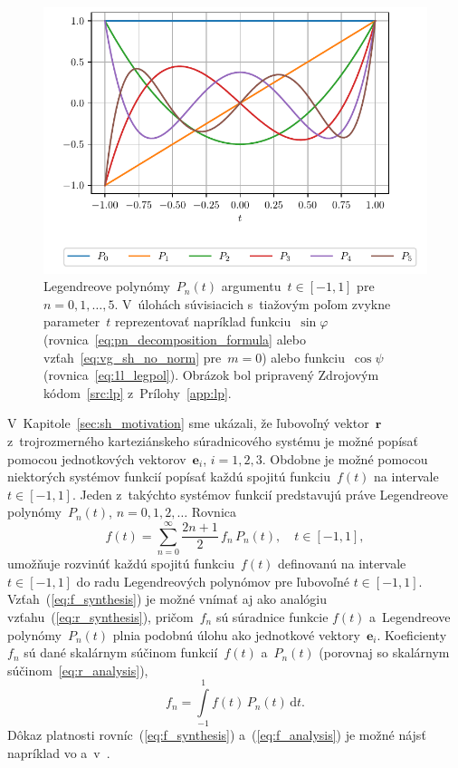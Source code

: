 \documentclass[a4paper, 12pt]{book}
\newcommand{\diff}{\mathrm d}
\let\vec\mathbf
\begin{document}
\begin{figure}[bt]
\centering
\includegraphics{./fig-legendre-polynomials.pdf}
\caption{Legendreove polynómy~$P_n(t)$ argumentu~$t \in [-1, 1]$ pre~$n = 0, 1, 
\dots, 5$.  V~úlohách súvisiacich s~tiažovým poľom zvykne parameter~$t$ 
reprezentovať napríklad funkciu~$\sin\varphi$ 
(rovnica~\ref{eq:pn_decomposition_formula} alebo vzťah~\ref{eq:vg_sh_no_norm} 
pre~$m = 0$) alebo funkciu~$\cos\psi$ (rovnica~\ref{eq:1l_legpol}).  Obrázok 
bol pripravený Zdrojovým
kódom~\ref{src:lp} z~Prílohy~\ref{app:lp}.}
\label{fig:lp}
\end{figure}

V~Kapitole~\ref{sec:sh_motivation} sme ukázali, že ľubovoľný vektor~$\vec r$
z~trojrozmerného karteziánskeho súradnicového systému je možné popísať pomocou
jednotkových vektorov~$\vec e_i$, $i = 1, 2, 3$.  Obdobne je možné pomocou
niektorých systémov funkcií popísať každú spojitú funkciu~$f(t)$ na intervale
$t \in [-1, 1]$.  Jeden z~takýchto systémov funkcií predstavujú práve
Legendreove polynómy~$P_n(t)$, $n = 0, 1, 2, \dots$  Rovnica
%
\begin{equation}
\label{eq:f_synthesis}
f(t) = \sum_{n = 0}^\infty \frac{2n + 1}{2} \, f_n \, P_n(t){,} \quad t \in 
[-1, 1]{,}
\end{equation}
%
umožňuje rozvinúť každú spojitú funkciu~$f(t)$ definovanú na intervale~$t \in 
[-1, 1]$ do radu Legendreových polynómov
pre ľubovoľné $t \in [-1, 1]$.  Vzťah~(\ref{eq:f_synthesis}) je možné vnímať aj
ako analógiu vzťahu~(\ref{eq:r_synthesis}), pričom~$f_n$ sú súradnice funkcie
$f(t)$ a~Legendreove polynómy~$P_n(t)$ plnia podobnú úlohu ako jednotkové
vektory~$\vec e_i$.  Koeficienty~$f_n$ sú dané skalárnym súčinom funkcií~$f(t)$
a~$P_n(t)$ (porovnaj so skalárnym súčinom~\ref{eq:r_analysis}),
%
\begin{equation}
\label{eq:f_analysis}
f_n = \int\limits_{-1}^1 f(t) \, P_n(t) \, \diff t{.}
\end{equation}
%
Dôkaz platnosti rovníc~(\ref{eq:f_synthesis}) a~(\ref{eq:f_analysis}) je možné 
nájsť napríklad vo \textcite{Freeden2009} 
a~v~\textcite{SansoGeoidDetermination}.
\end{document}
